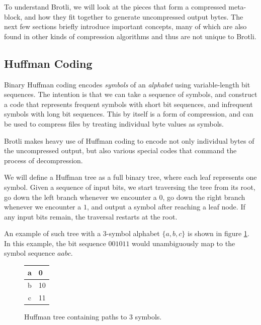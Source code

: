\documentclass[english,master,dept460,male,cpp,cpdeclaration]{diploma}
\newcommand{\tikzfigure}[1]{
	\tikzsetnextfilename{#1}%
}
\begin{document}
To understand Brotli, we will look at the pieces that form a compressed meta-block, and how they fit together to generate uncompressed output bytes. The next few sections briefly introduce important concepts, many of which are also found in other kinds of compression algorithms and thus are not unique to Brotli.

	\subsection{Huffman Coding}
	
	Binary Huffman coding encodes \emph{symbols} of an \emph{alphabet} using variable-length bit sequences\cite{Huffman}. The intention is that we can take a sequence of symbols, and construct a code that represents frequent symbols with short bit sequences, and infrequent symbols with long bit sequences. This by itself is a form of compression, and can be used to compress files by treating individual byte values as symbols.
	
	Brotli makes heavy use of Huffman coding to encode not only individual bytes of the uncompressed output, but also various special codes that command the process of decompression.
	
	We will define a Huffman tree as a full binary tree, where each leaf represents one symbol. Given a sequence of input bits, we start traversing the tree from its root, go down the left branch whenever we encounter a $0$, go down the right branch whenever we encounter a $1$, and output a symbol after reaching a leaf node. If any input bits remain, the traversal restarts at the root.
	
	An example of such tree with a 3-symbol alphabet $\{a, b, c\}$ is shown in figure \ref{fig:huffman-tree}. In this example, the bit sequence $001011$ would unambiguously map to the symbol sequence $aabc$.
	
	\begin{figure}[H]
		\centering
		\medskip
		
		\noindent
		\begin{minipage}{0.22\textwidth}
			\centering
			\tikzfigure{huffman-tree-example}
		\end{minipage}%
		\begin{minipage}{0.22\textwidth}
			\centering
			
			\begin{tabular}{c|l}
				a & 0 \\
				\hline
				b & 10 \\
				\hline
				c & 11 \\
			\end{tabular}
			
		\end{minipage}
	
		\caption{Huffman tree containing paths to 3 symbols.}
		\label{fig:huffman-tree}
	\end{figure}
	
\end{document}
